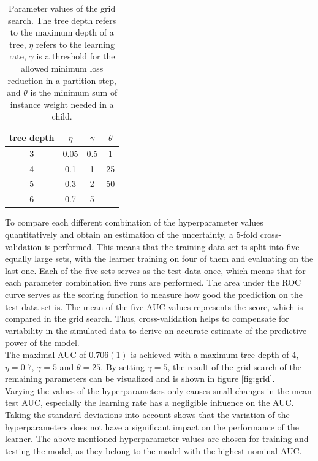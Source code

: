   \begin{table}
    \centering
    \begin{tabular}{c c c c}
      \toprule
      tree depth & $\eta$ & $\gamma$ & $\theta$ \\
      \midrule
      3 & 0.05 & 0.5 & 1  \\
      4 & 0.1  & 1   & 25  \\
      5 & 0.3  & 2 & 50  \\
      6 & 0.7  & 5   &  \\
    \end{tabular}
    \caption{Parameter values of the grid search. The tree depth refers to the maximum depth of a tree, $\eta$ refers to the learning rate,
    $\gamma$ is a threshold for the allowed minimum loss reduction in a partition step, and $\theta$ is the minimum sum of instance weight needed in a child.}
    \label{tab:grid}
  \end{table}
To compare each different combination of the hyperparameter values quantitatively and obtain an estimation of the uncertainty, a 5-fold cross-validation is performed. This means that
the training data set is split into five equally
large sets, with the learner training on four of them and evaluating on the last one. Each of the five sets serves as the test data once, which means that for each
parameter combination five runs are performed. The area under the ROC curve serves as the scoring function to measure how good the prediction on the test data set is.
The mean of the five AUC values represents the score, which is compared in the grid search. Thus, cross-validation helps to compensate for variability in the simulated
data to derive an accurate estimate of the predictive power of the model. \\
The maximal AUC of $0.706(1)$ is achieved with a maximum tree depth of 4, $\eta=0.7$, $\gamma=5$ and $\theta=25$. By setting $\gamma=5$, the result of the grid search of the remaining
parameters can be visualized and is shown in figure \ref{fig:grid}. \\
Varying the values of the hyperparameters only causes small changes in the mean test AUC, especially the learning rate has a negligible influence on the AUC. Taking the
standard deviations into account shows that the variation of the hyperparameters does not have a significant impact on the performance of the learner.
The above-mentioned hyperparameter values are chosen for training and testing the model, as they belong to  the model with the highest nominal AUC.

